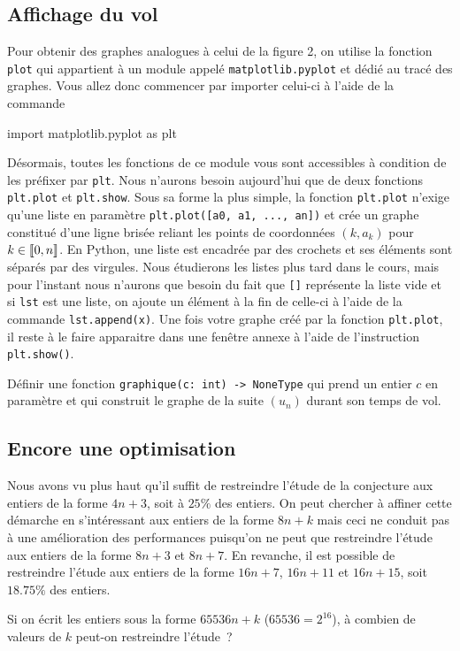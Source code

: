 \documentclass{magnolia}
\begin{document}
\subsection{Affichage du vol}

Pour obtenir des graphes analogues à celui de la figure 2, on utilise la fonction \verb!plot! qui appartient à
un module appelé \verb!matplotlib.pyplot! et dédié au tracé des graphes. Vous allez donc commencer par importer
celui-ci à l'aide de la commande

\begin{pythoncode}
import matplotlib.pyplot as plt
\end{pythoncode}

Désormais, toutes les fonctions de ce module vous sont accessibles à condition de les préfixer par \verb!plt!.
Nous n'aurons besoin aujourd'hui que de deux fonctions \verb!plt.plot! et \verb!plt.show!. Sous sa forme la plus
simple, la fonction \verb!plt.plot! n'exige qu'une liste en paramètre \verb!plt.plot([a0, a1, ..., an])! et
crée un graphe constitué d'une ligne brisée reliant les points de coordonnées $(k,a_k)$ pour $k\in\left\llbracket 0,n\right\rrbracket$.
En Python, une liste est encadrée par des crochets et ses éléments sont séparés par des virgules. Nous étudierons
les listes plus tard dans le cours, mais pour l'instant nous n'aurons que besoin du fait que \verb![]! représente la liste
vide et si \verb!lst! est une liste, on ajoute un élément à la fin de celle-ci à l'aide de la commande
\verb!lst.append(x)!. Une fois votre graphe créé par la fonction \verb!plt.plot!, il reste à le faire
apparaitre dans une fenêtre annexe à l'aide de l'instruction \verb!plt.show()!.

\begin{questions}
\question Définir une fonction \verb!graphique(c: int) -> NoneType! qui prend un entier $c$ en paramètre et
  qui construit le graphe de la suite $(u_n)$ durant son temps de vol.
\end{questions}

\subsection{Encore une optimisation}

Nous avons vu plus haut qu'il suffit de restreindre l'étude de la conjecture aux entiers de la forme $4n+3$,
soit à $25\%$ des entiers. On peut chercher à affiner cette démarche en s'intéressant aux entiers de la forme
$8n+k$ mais ceci ne conduit pas à une amélioration des performances puisqu'on ne peut que restreindre l'étude
aux entiers de la forme $8n+3$ et $8n+7$. En revanche, il est possible de restreindre l'étude aux entiers
de la forme $16n+7$, $16n+11$ et $16n+15$, soit $18.75\%$ des entiers.

\begin{questions}
\question Si on écrit les entiers sous la forme $65536n+k$ ($65536=2^{16}$), à combien de valeurs de $k$
peut-on restreindre l'étude~?
\end{questions}
\end{document}
